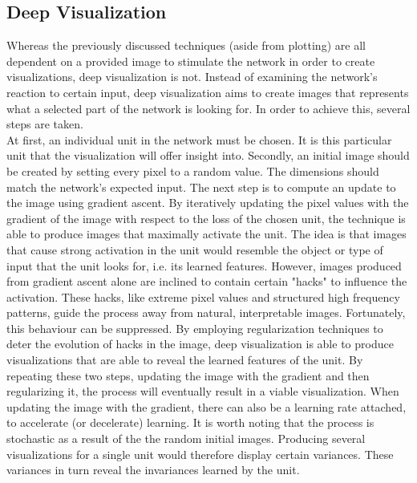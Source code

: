\subsection{Deep Visualization}

Whereas the previously discussed techniques (aside from plotting) are all dependent on a provided image to stimulate the network in order to create visualizations, deep visualization is not. Instead of examining the network's reaction to certain input, deep visualization aims to create images that represents what a selected part of the network is looking for. In order to achieve this, several steps are taken. \\

\noindent At first, an individual unit in the network must be chosen. It is this particular unit that the visualization will offer insight into. Secondly, an initial image should be created by setting every pixel to a random value. The dimensions should match the network's expected input. The next step is to compute an update to the image using gradient ascent. By iteratively updating the pixel values with the gradient of the image with respect to the loss of the chosen unit, the technique is able to produce images that maximally activate the unit. The idea is that images that cause strong activation in the unit would resemble the object or type of input that the unit looks for, i.e. its learned features. However, images produced from gradient ascent alone are inclined to contain certain "hacks" to influence the activation. These hacks, like extreme pixel values and structured high frequency patterns, guide the process away from natural, interpretable images. Fortunately, this behaviour can be suppressed. By employing regularization techniques to deter the evolution of hacks in the image, deep visualization is able to produce visualizations that are able to reveal the learned features of the unit. By repeating these two steps, updating the image with the gradient and then regularizing it, the process will eventually result in a viable visualization. When updating the image with the gradient, there can also be a learning rate attached, to accelerate (or decelerate) learning. It is worth noting that the process is stochastic as a result of the the random initial images. Producing several visualizations for a single unit would therefore display certain variances. These variances in turn reveal the invariances learned by the unit. \\

